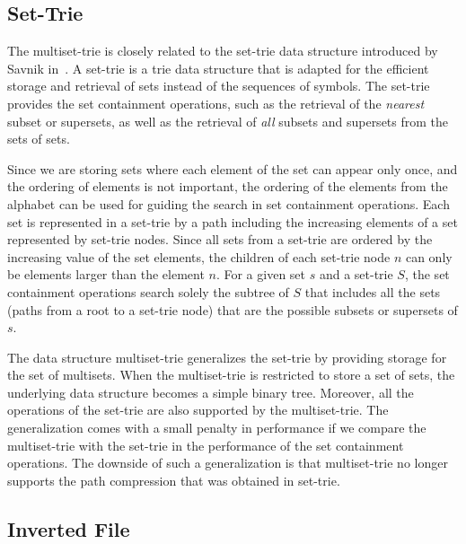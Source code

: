 \documentclass[algorithms,article,accept,pdftex,moreauthors]{Definitions/mdpi}
\begin{document}
\subsection{Set-Trie\label{rel-strie}}

The multiset-trie is closely related to the set-trie data structure introduced by Savnik in~\cite{savnik2013index,savnik2021plos}. A set-trie is a trie data structure that is adapted for the efficient storage and retrieval of sets instead of the sequences of symbols. The set-trie provides the set containment operations, such as the retrieval of the \emph{nearest} subset or supersets, as well as the retrieval of \emph{all} subsets and supersets from the sets of sets.

Since we are storing sets where each element of the set can appear only once, and the ordering of elements is not important, the ordering of the elements from the alphabet can be used for guiding the search in set containment operations. Each set is represented in a set-trie by a path including the increasing elements of a set represented by set-trie nodes. Since all sets from a set-trie are ordered by the increasing value of the set elements, the children of each set-trie node $n$ can only be elements larger than the element $n$. For a given set $s$ and a set-trie $S$, the set containment operations search solely the subtree of $S$ that includes all the sets (paths from a root to a set-trie node) that are the possible subsets or supersets of $s$.

The data structure multiset-trie generalizes the set-trie by providing storage for the set of multisets. When the multiset-trie is restricted to store a set of sets, the underlying data structure becomes a simple binary tree. Moreover, all the operations of the set-trie are also supported by the multiset-trie. The generalization comes with a small penalty in performance if we compare the multiset-trie with the set-trie in the performance of the set containment operations. The downside of such a generalization is that multiset-trie no longer supports the path compression that was obtained in set-trie. 

\subsection{Inverted File\label{rel-invfile}}
\end{document}
